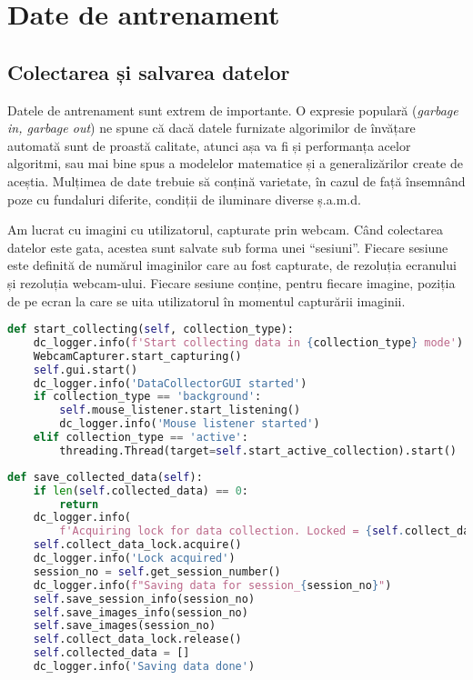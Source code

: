 \chapter{Date de antrenament}
\label{chapter3}
\section{Colectarea și salvarea datelor}
Datele de antrenament sunt extrem de importante.
O expresie populară (\emph{garbage in, garbage out}) ne spune că dacă datele furnizate algorimilor de învățare automată sunt de proastă calitate, atunci așa va fi și performanța acelor algoritmi, sau mai bine spus a modelelor matematice și a generalizărilor create de aceștia.
Mulțimea de date trebuie să conțină varietate, în cazul de față însemnând poze cu fundaluri diferite, condiții de iluminare diverse ș.a.m.d.

Am lucrat cu imagini cu utilizatorul, capturate prin webcam.
Când colectarea datelor este gata, acestea sunt salvate sub forma unei ``sesiuni''.
Fiecare sesiune este definită de numărul imaginilor care au fost capturate, de rezoluția ecranului și rezoluția webcam-ului.
Fiecare sesiune conține, pentru fiecare imagine, poziția de pe ecran la care se uita utilizatorul în momentul capturării imaginii.

\begin{lstlisting}[language=Python, caption=Colectarea datelor]
def start_collecting(self, collection_type):
    dc_logger.info(f'Start collecting data in {collection_type} mode')
    WebcamCapturer.start_capturing()
    self.gui.start()
    dc_logger.info('DataCollectorGUI started')
    if collection_type == 'background':
        self.mouse_listener.start_listening()
        dc_logger.info('Mouse listener started')
    elif collection_type == 'active':
        threading.Thread(target=self.start_active_collection).start()
\end{lstlisting}

\begin{lstlisting}[language=Python, caption=Salvarea datelor]
def save_collected_data(self):
    if len(self.collected_data) == 0:
        return
    dc_logger.info(
        f'Acquiring lock for data collection. Locked = {self.collect_data_lock.locked()}')
    self.collect_data_lock.acquire()
    dc_logger.info('Lock acquired')
    session_no = self.get_session_number()
    dc_logger.info(f"Saving data for session_{session_no}")
    self.save_session_info(session_no)
    self.save_images_info(session_no)
    self.save_images(session_no)
    self.collect_data_lock.release()
    self.collected_data = []
    dc_logger.info('Saving data done')
\end{lstlisting}

